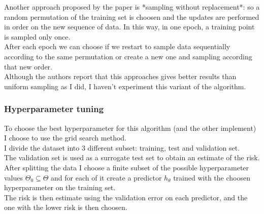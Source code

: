 Another approach proposed by the paper is *sampling without replacement*: so a random permutation of the training set is choosen and the updates are performed in order on the new sequence of data.
In this way, in one epoch, a training point is sampled only once.\\
After each epoch we can choose if we restart to sample data sequentially according to the same permutation or create a new one and sampling according that new order.\\
Although the authors report that this approaches gives better results than uniform sampling as I did, I haven't experiment this variant of the algorithm.\\

\subsubsection{Hyperparameter tuning}
To choose the best hyperparameter for this algorithm (and the other implement) I choose to use the grid search method.\\
I divide the dataset into 3 different subset: training, test and validation set.\\
The validation set is used as a surrogate test set to obtain an estimate of the risk.\\
After splitting the data I choose a finite subset of the possible hyperparameter values $\Theta_0 \subseteq \Theta$ and for each of it create a predictor $h_\theta$ trained with the choosen hyperparameter on the training set.\\
The risk is then estimate using the validation error on each predictor, and the one with the lower risk is then choosen.

